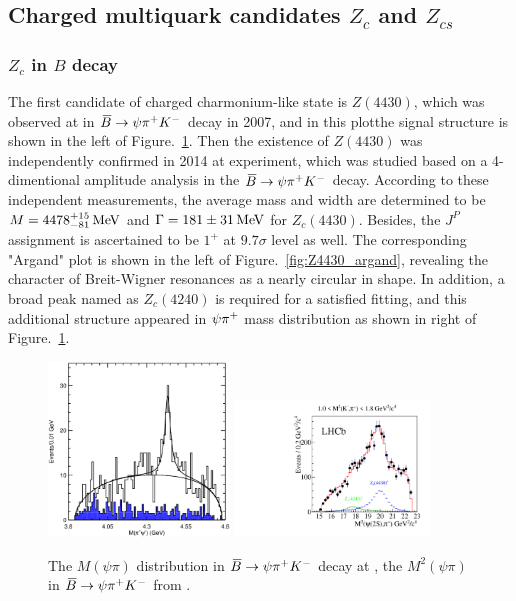 
\subsection{Charged multiquark candidates $Z_{c}$ and $Z_{cs}$}

\subsubsection{$Z_{c}$ in $B$ decay }

The first candidate of charged charmonium-like state is $Z(4430)$,
which was observed at \belle in ${\kern 0.18em\overline{\kern -0.18em B}}\rightarrow\psi{\ensuremath{{\pi}^+}}{\ensuremath{{K}^-}}$ decay in 2007\supercite{PhysRevLett.110.252001},
and in this plotthe signal structure is shown in the left of Figure.~\ref{fig:Z4430}.
Then the existence of $Z(4430)$ was independently confirmed in 2014 at \lhcb experiment\supercite{LHCb-PAPER-2014-014},
which was studied based on a 4-dimentional amplitude analysis in the ${\kern 0.18em\overline{\kern -0.18em B}}\rightarrow\psi{\ensuremath{{\pi}^+}}{\ensuremath{{K}^-}}$ decay.
According to these independent measurements,
the average mass and width are determined to be $M=4478^{+15}_{-81} \text{\,Me\kern -0.1em V}$ and $\Gamma=181\pm31 \text{\,Me\kern -0.1em V}$ for $Z_{c}(4430)$.
Besides,
the $J^{P}$ assignment is ascertained to be $1^{+}$ at $9.7\sigma$ level as well.
The corresponding "Argand" plot is shown in the left of Figure.~\ref{fig:Z4430_argand},
revealing the character of Breit-Wigner resonances as a nearly circular in shape.
In addition,
a broad peak named as $Z_{c}(4240)$ is required for a satisfied fitting,
and this additional structure appeared in $\psi{\ensuremath{{\pi}^+}}$ mass distribution as shown in right of Figure.~\ref{fig:Z4430}.

\begin{figure}[!hbtp]
\centering
   \includegraphics[width=0.43\textwidth]{Figures/01_Introduction/Exotic/charged_particle/Belle_Z4430} %
   \includegraphics[width=0.46\textwidth]{Figures/01_Introduction/Exotic/charged_particle/LHCb_Z4430} %
   \caption{ 
   The $M(\psi\pi)$ distribution in ${\kern 0.18em\overline{\kern -0.18em B}}\rightarrow\psi{\ensuremath{{\pi}^+}}{\ensuremath{{K}^-}}$ decay at \belle\supercite{PhysRevLett.110.252001},  
   the $M^{2}(\psi\pi)$ in ${\kern 0.18em\overline{\kern -0.18em B}}\rightarrow\psi{\ensuremath{{\pi}^+}}{\ensuremath{{K}^-}}$ from \lhcb\supercite{LHCb-PAPER-2014-014}.}
\label{fig:Z4430}
\end{figure}


